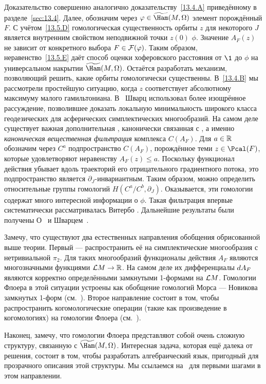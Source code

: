Доказательство совершенно аналогично доказательству~\ref{13.4.A}
приведённому в разделе~\ref{sec:13.4}.
Далее, обозначим через $\phi\in\widetilde\Ham(M,\Omega)$ элемент порождённый $F$.
С учётом~\ref{13.5.D} гомологическая
существенность орбиты $z$ для некоторого $J$ является внутренним свойством
неподвижной точки $z(0)$  $\phi$.
Значение $A_{F}(z)$ не зависит от конкретного выбора $F\in\mathcal{F}(\varphi)$.
Таким образом, неравенство~\ref{13.5.E} даёт способ оценки хоферовского расстояния от $\1$ до $\phi$ на универсальном накрытии $\widetilde\Ham(M,\Omega)$.
Остаётся разработать механизм, позволяющий решить, какие орбиты
гомологически существенны. 
В~\ref{13.4.B} мы рассмотрели простейшую ситуацию, когда $z$
соответствует абсолютному максимуму малого
 гамильтониана. 
В~\cite{Sch3} Шварц использовал более изощрённое рассуждение, позволившее доказать локальную минимальность широкого класса геодезических для асферических симплектических многообразий. 
На самом деле существует важная дополнительная , канонически связанная с , а именно
\textit{каноническая вещественная фильтрация} комплекса $C(A_{F})$.
Для $a\in\mathbb{R}$ обозначим через $C^{a}$ подпространство $C(A_{F})$,
порождённое теми $z\in\Pcal(F)$, которые удовлетворяют неравенству
$A_{F}(z)\le a$.
Поскольку функционал действия убывает вдоль траекторий его
отрицательного градиентного потока, это подпространство является
$\partial_{J}$-инвариантным. 
Таким образом, можно определить относительные группы гомологий
$H(C^{a}/C^{b},\partial_{J})$.
Оказывается, эти гомологии содержат много интересной информации о $\phi$.
Такая фильтрация впервые систематически рассматривалась Витербо \cite{V1}.
Дальнейшие результаты были получены  О~\cite{O4} и Шварцем~\cite{Sch3}.

Замечу, что существуют два естественных направления обобщения
обрисованной выше теории. 
Первый --- распространить её на симплектические многообразия с
нетривиальной $π_{2}$. 
Для таких многообразий функционалы действия $A_{F}$ являются
многозначными функциями $\mathcal{L} M\to\mathbb{R}$. На самом деле их дифференциалы
$d A_{F}$ являются корректно определёнными замкнутыми 1-формами на
$\mathcal{L} M$.
Гомологии Флоера в этой ситуации устроены как обобщение гомологий
Морса --- Новикова замкнутых 1-форм (см.~\cite{HS}).
Второе направление состоит в том, чтобы распространить
когомологические операции (такие как произведение в когомологиях) на
гомологии Флоера (см.~\cite{PSS}). 

Наконец, замечу, что гомологии Флоера
представляют собой очень сложную структуру, связанную с
$\widetilde\Ham(M,\Omega)$. 
Интересная задача, которая ещё далека от решения, состоит в том, чтобы
разработать алгебраический язык, пригодный для прозрачного описания
этой структуры. 
Мы ссылаемся на~\cite{Fu} для  первыми шагами в
этом направлении.  




